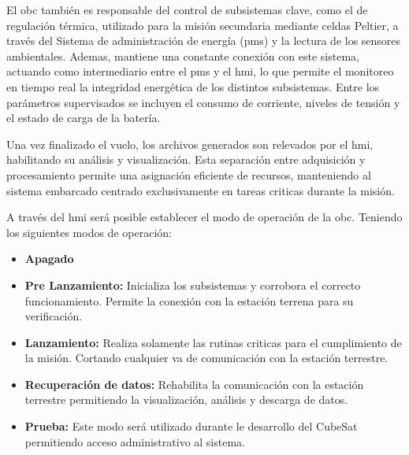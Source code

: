 \begin{itemize}
        El \acrshort{obc} también es responsable del control de subsistemas clave, como el de regulación
        térmica, utilizado para la misión secundaria mediante celdas Peltier, a través del Sistema de
        administración de energía (\acrshort{pms}) y la lectura de los sensores ambientales. Ademas, mantiene una
        constante conexión con este sistema, actuando como intermediario entre el \acrshort{pms} y el \acrshort{hmi}, lo
        que permite el monitoreo en tiempo real la integridad energética de los distintos subsistemas.
        Entre los parámetros supervisados se incluyen el consumo de corriente, niveles de tensión y el
        estado de carga de la batería.

        Una vez finalizado el vuelo, los archivos generados son relevados por el \acrshort{hmi}, habilitando
        su análisis y visualización. Esta separación entre adquisición y procesamiento permite una asignación
        eficiente de recursos, manteniendo al sistema embarcado centrado
        exclusivamente en tareas criticas durante la misión.

        A través del \acrshort{hmi} será posible establecer el modo de operación de la \acrshort{obc}. Teniendo los siguientes modos de operación:
        \begin{itemize}
           \item \textbf{Apagado}
           \item \textbf{Pre Lanzamiento:} Inicializa los subsistemas y corrobora el correcto funcionamiento.
            Permite la conexión con la estación terrena para su verificación.
           \item \textbf{Lanzamiento:} Realiza solamente las rutinas criticas para el cumplimiento de la
          misión. Cortando cualquier va de comunicación con la estación terrestre.
           \item \textbf{Recuperación de datos:} Rehabilita la comunicación con la estación terrestre
          permitiendo la visualización, análisis y descarga de datos.
           \item \textbf{Prueba:} Este modo será utilizado durante le desarrollo del CubeSat permitiendo
          acceso administrativo al sistema.
        \end{itemize}


\end{itemize}
